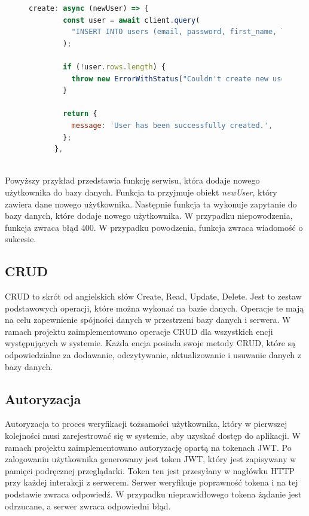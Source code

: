 \begin{figure}[H]
\begin{lstlisting}[language=JavaScript, caption=Przykładowa definicja serwisu, label=lst:service]
    create: async (newUser) => {
        const user = await client.query(
          "INSERT INTO users (email, password, first_name, last_name) VALUES ("${newUser.email}", "${newUser.password}", "${newUser.name}", "${newUser.last_name}") returning *;"
        );
    
        if (!user.rows.length) {
          throw new ErrorWithStatus("Couldn't create new user with given data:\n${newUser}", 400);
        }
    
        return {
          message: 'User has been successfully created.',
        };
      },
    
\end{lstlisting}
\end{figure}

Powyższy przykład przedstawia funkcję serwisu, która dodaje nowego użytkownika do bazy danych. Funkcja ta przyjmuje obiekt \textit{newUser}, który zawiera dane nowego użytkownika. Następnie funkcja ta wykonuje zapytanie do bazy danych, które dodaje nowego użytkownika. W przypadku niepowodzenia, funkcja zwraca błąd 400. W przypadku powodzenia, funkcja zwraca wiadomość o sukcesie.


\subsection{CRUD}
CRUD to skrót od angielskich słów Create, Read, Update, Delete. Jest to zestaw podstawowych operacji, które można wykonać na bazie danych. Operacje te mają na celu zapewnienie spójności danych w przestrzeni bazy danych i serwera. W ramach projektu zaimplementowano operacje CRUD dla wszystkich encji występujących w systemie. Każda encja posiada swoje metody CRUD, które są odpowiedzialne za dodawanie, odczytywanie, aktualizowanie i usuwanie danych z bazy danych. 

\subsection{Autoryzacja}
Autoryzacja to proces weryfikacji tożsamości użytkownika, który w pierwszej kolejności musi zarejestrować się w systemie, aby uzyskać dostęp do aplikacji. W ramach projektu zaimplementowano autoryzację opartą na tokenach JWT. Po zalogowaniu użytkownika generowany jest token JWT, który jest zapisywany w pamięci podręcznej przeglądarki. Token ten jest przesyłany w nagłówku HTTP przy każdej interakcji z serwerem. Serwer weryfikuje poprawność tokena i na tej podstawie zwraca odpowiedź. W przypadku nieprawidłowego tokena żądanie jest odrzucane, a serwer zwraca odpowiedni błąd.

